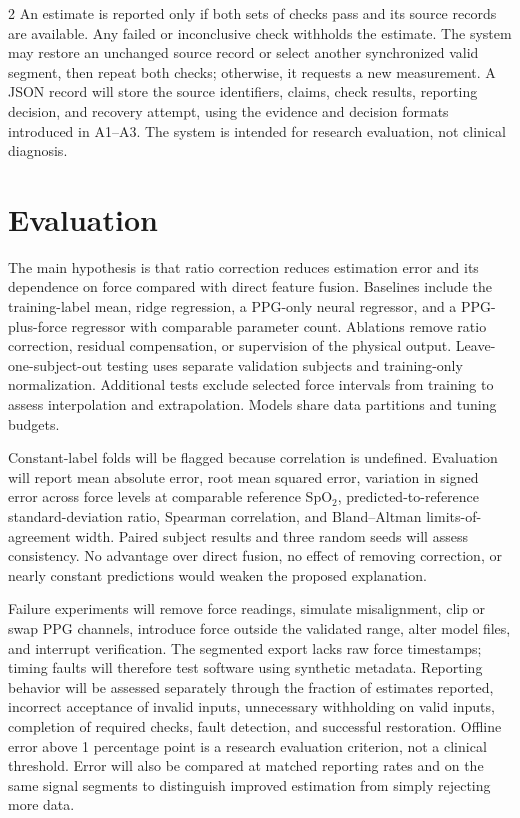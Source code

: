 \documentclass[10pt]{article}
\begin{document}
\begin{multicols*}{2}
An estimate is reported only if both sets of checks pass and its source records are available. Any failed or inconclusive check withholds the estimate. The system may restore an unchanged source record or select another synchronized valid segment, then repeat both checks; otherwise, it requests a new measurement. A JSON record will store the source identifiers, claims, check results, reporting decision, and recovery attempt, using the evidence and decision formats introduced in A1--A3. The system is intended for research evaluation, not clinical diagnosis.

\section{Evaluation}
The main hypothesis is that ratio correction reduces estimation error and its dependence on force compared with direct feature fusion. Baselines include the training-label mean, ridge regression, a PPG-only neural regressor, and a PPG-plus-force regressor with comparable parameter count. Ablations remove ratio correction, residual compensation, or supervision of the physical output. Leave-one-subject-out testing uses separate validation subjects and training-only normalization. Additional tests exclude selected force intervals from training to assess interpolation and extrapolation. Models share data partitions and tuning budgets.

Constant-label folds will be flagged because correlation is undefined. Evaluation will report mean absolute error, root mean squared error, variation in signed error across force levels at comparable reference SpO$_2$, predicted-to-reference standard-deviation ratio, Spearman correlation, and Bland--Altman limits-of-agreement width. Paired subject results and three random seeds will assess consistency. No advantage over direct fusion, no effect of removing correction, or nearly constant predictions would weaken the proposed explanation.

Failure experiments will remove force readings, simulate misalignment, clip or swap PPG channels, introduce force outside the validated range, alter model files, and interrupt verification. The segmented export lacks raw force timestamps; timing faults will therefore test software using synthetic metadata. Reporting behavior will be assessed separately through the fraction of estimates reported, incorrect acceptance of invalid inputs, unnecessary withholding on valid inputs, completion of required checks, fault detection, and successful restoration. Offline error above 1 percentage point is a research evaluation criterion, not a clinical threshold. Error will also be compared at matched reporting rates and on the same signal segments to distinguish improved estimation from simply rejecting more data.


\end{multicols*}
\end{document}
